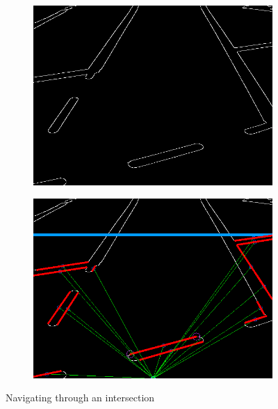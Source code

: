 \documentclass [10pt]{article}
\begin{document}
\begin{figure}
\centering
\begin{subfigure}
  \centering
  \includegraphics[width=.4\linewidth]{figures/intersection3_c.png}
\end{subfigure}%
\begin{subfigure}
  \centering
  \includegraphics[width=.4\linewidth]{figures/intersection3_h.png}
\end{subfigure}
\caption{Navigating through an intersection}
\label{fig:Fig6}

\end{figure}
\end{document}

